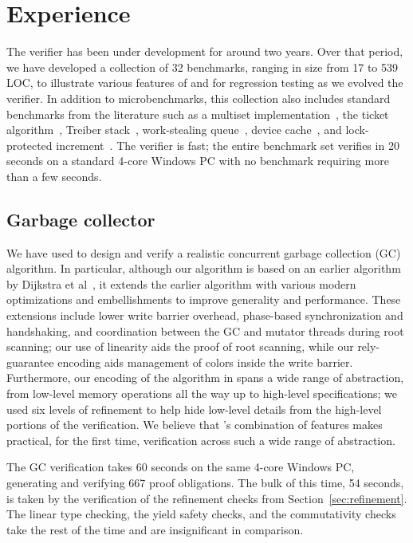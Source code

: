 \section{Experience}
\label{sec:experience}

The \civl verifier has been under development for around two years.  
Over that period, we have developed a collection of 32 benchmarks, 
ranging in size from 17 to 539 LOC, to illustrate various features of
\civl and for regression testing as we evolved the verifier.
In addition to microbenchmarks, this collection also includes
standard benchmarks from the literature such as a multiset implementation~\cite{ElmasTQ05}, 
the ticket algorithm~\cite{FarzanKP14}, 
Treiber stack~\cite{Herlihy2008}, work-stealing queue~\cite{Blumofe1999},
device cache~\cite{ElmasQT09}, and lock-protected increment~\cite{FlanaganQ03}. 
The \civl verifier is fast; the entire benchmark set verifies in 20 seconds on a standard 4-core Windows PC 
with no benchmark requiring more than a few seconds.

\subsection{Garbage collector}
We have used \civl to design and verify a realistic concurrent garbage collection (GC) algorithm.  
In particular, although our algorithm is based on an earlier algorithm by Dijkstra et al~\cite{dijk78}, 
it extends the earlier algorithm with various modern optimizations and embellishments to improve generality and performance.  
These extensions include lower write barrier overhead, phase-based synchronization and handshaking, 
and coordination between the GC and mutator threads during root scanning; our use of linearity aids the proof of root scanning, 
while our rely-guarantee encoding aids management of colors inside the write barrier.  
Furthermore, our encoding of the algorithm in \civl spans a wide range of abstraction, 
from low-level memory operations all the way up to high-level specifications; 
we used six levels of refinement to help hide low-level details from the high-level portions of the verification.
We believe that \civl's combination of features makes practical, for the first time, verification across such a wide range of abstraction.

The GC verification takes 60 seconds on the same 4-core Windows PC, generating and verifying 667 proof obligations. 
The bulk of this time, 54 seconds, is taken by the verification of the refinement checks from Section~\ref{sec:refinement}.
The linear type checking, the yield safety checks, and the commutativity checks take the rest of the time and are insignificant in comparison.

